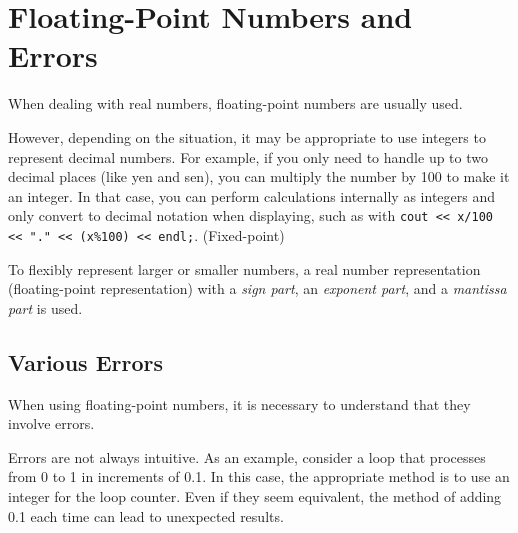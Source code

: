 \section{Floating-Point Numbers and Errors}\label{section:floating-point-numbers}

When dealing with real numbers, floating-point numbers are usually used.

However, depending on the situation, it may be appropriate to use integers to represent decimal numbers. For example, if you only need to handle up to two decimal places (like yen and sen), you can multiply the number by 100 to make it an integer. In that case, you can perform calculations internally as integers and only convert to decimal notation when displaying, such as with \texttt{cout << x/100 << "." << (x\%100) << endl;}. (Fixed-point)

To flexibly represent larger or smaller numbers, a real number representation (floating-point representation) with a \emph{sign part}, an \emph{exponent part}, and a \emph{mantissa part} is used.

\subsection{Various Errors}
When using floating-point numbers, it is necessary to understand that they involve errors.

Errors are not always intuitive.
As an example, consider a loop that processes from 0 to 1 in increments of 0.1.
In this case, the appropriate method is to use an integer for the loop counter. Even if they seem equivalent, the method of adding 0.1 each time can lead to unexpected results.

